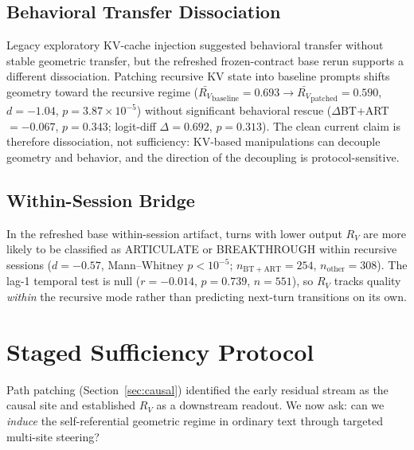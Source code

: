 \documentclass{article}
\newcommand{\RV}{R_V}
\newcommand{\dcohen}{d}
\begin{document}
\subsection{Behavioral Transfer Dissociation}
\label{sec:dissoc_behavioral}

Legacy exploratory KV-cache injection suggested behavioral transfer without stable geometric
transfer, but the refreshed frozen-contract base rerun supports a different dissociation.
Patching recursive KV state into baseline prompts shifts geometry toward the recursive regime
($\bar{\RV}_\mathrm{baseline} = 0.693 \to \bar{\RV}_\mathrm{patched} = 0.590$,
$\dcohen = -1.04$, $p = 3.87 \times 10^{-5}$) without significant behavioral rescue
($\Delta$BT+ART$ = -0.067$, $p = 0.343$; logit-diff $\Delta = 0.692$, $p = 0.313$).
The clean current claim is therefore dissociation, not sufficiency:
KV-based manipulations can decouple geometry and behavior, and the direction of the decoupling is
protocol-sensitive.

\subsection{Within-Session Bridge}
\label{sec:bridge}

In the refreshed base within-session artifact, turns with lower output $\RV$ are more likely to be
classified as ARTICULATE or BREAKTHROUGH within recursive sessions
($\dcohen = -0.57$, Mann--Whitney $p < 10^{-5}$; $n_\mathrm{BT+ART}=254$,
$n_\mathrm{other}=308$).
The lag-1 temporal test is null ($r = -0.014$, $p = 0.739$, $n = 551$), so $\RV$
tracks quality \emph{within} the recursive mode rather than predicting next-turn transitions on its own.



\section{Staged Sufficiency Protocol}
\label{sec:sufficiency}

Path patching (Section~\ref{sec:causal}) identified the early residual stream as the causal
site and established $\RV$ as a downstream readout.
We now ask: can we \emph{induce} the self-referential geometric regime in ordinary text
through targeted multi-site steering?
\end{document}
